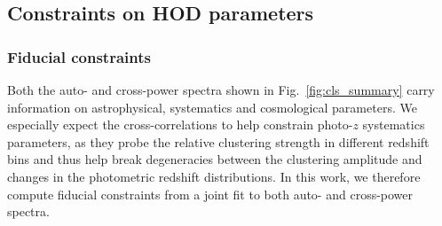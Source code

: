\documentclass[a4paper,11pt]{article}
\begin{document}
  \subsection{Constraints on HOD parameters}\label{ssec:results.hod-constraints}
    \subsubsection{Fiducial constraints}\label{sssec:results.hod-constraints.fiducial}
      Both the auto- and cross-power spectra shown in Fig.~\ref{fig:cls_summary} carry information on astrophysical, systematics and cosmological parameters. We especially expect the cross-correlations to help constrain photo-$z$ systematics parameters, as they probe the relative clustering strength in different redshift bins and thus help break degeneracies between the clustering amplitude and changes in the photometric redshift distributions. In this work, we therefore compute fiducial constraints from a joint fit to both auto- and cross-power spectra.
\end{document}
